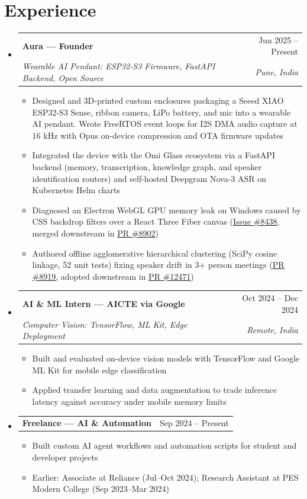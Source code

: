 \documentclass[a4paper,11pt]{article}
\makeatletter
\newcommand{\resumeItem}[1]{
  \item\small{#1}
}
\newcommand{\resumeItemListStart}{\begin{itemize}[rightmargin=0.11in]}
\newcommand{\resumeItemListEnd}{\end{itemize}}
\newcommand{\resumeQuadHeading}[4]{
  \item
  \begin{tabular*}{0.96\textwidth}[t]{l@{\extracolsep{\fill}}r}
    \textbf{#1} & #2 \\
    \textit{\small#3} & \textit{\small #4} \\
  \end{tabular*}
}
\newcommand{\resumeQuadHeadingChild}[2]{
  \item
  \begin{tabular*}{0.96\textwidth}[t]{l@{\extracolsep{\fill}}r}
    \textbf{\small#1} & {\small#2} \\
  \end{tabular*}
}
\newcommand{\resumeHeadingListStart}{
  \begin{itemize}[leftmargin=0.15in, label={}]
}
\newcommand{\resumeHeadingListEnd}{\end{itemize}}
\makeatother
\begin{document}
\section{Experience}
\resumeHeadingListStart{}
  \resumeQuadHeading{Aura --- Founder}{Jun 2025 -- Present}
  {Wearable AI Pendant: ESP32-S3 Firmware, FastAPI Backend, Open Source}{Pune, India}
    \resumeItemListStart{}
      \resumeItem{Designed and 3D-printed custom enclosures packaging a Seeed XIAO ESP32-S3 Sense, ribbon camera, LiPo battery, and mic into a wearable AI pendant. Wrote FreeRTOS event loops for I2S DMA audio capture at 16 kHz with Opus on-device compression and OTA firmware updates}
      \resumeItem{Integrated the device with the Omi Glass ecosystem via a FastAPI backend (memory, transcription, knowledge graph, and speaker identification routers) and self-hosted Deepgram Nova-3 ASR on Kubernetes Helm charts}
      \resumeItem{Diagnosed an Electron WebGL GPU memory leak on Windows caused by CSS backdrop filters over a React Three Fiber canvas (\href{https://github.com/BasedHardware/omi/issues/8438}{\uline{Issue \#8438}}, merged downstream in \href{https://github.com/BasedHardware/omi/pull/8902}{\uline{PR \#8902}})}
      \resumeItem{Authored offline agglomerative hierarchical clustering (SciPy cosine linkage, 52 unit tests) fixing speaker drift in 3+ person meetings (\href{https://github.com/BasedHardware/omi/pull/8919}{\uline{PR \#8919}}, adopted downstream in \href{https://github.com/BasedHardware/omi/pull/12471}{\uline{PR \#12471}})}
    \resumeItemListEnd{}

  \resumeQuadHeading{AI \& ML Intern --- AICTE via Google}{Oct 2024 -- Dec 2024}
  {Computer Vision: TensorFlow, ML Kit, Edge Deployment}{Remote, India}
    \resumeItemListStart{}
      \resumeItem{Built and evaluated on-device vision models with TensorFlow and Google ML Kit for mobile edge classification}
      \resumeItem{Applied transfer learning and data augmentation to trade inference latency against accuracy under mobile memory limits}
    \resumeItemListEnd{}

  \resumeQuadHeadingChild{Freelance --- AI \& Automation}{Sep 2024 -- Present}
    \resumeItemListStart{}
      \resumeItem{Built custom AI agent workflows and automation scripts for student and developer projects}
      \resumeItem{Earlier: Associate at Reliance (Jul--Oct 2024); Research Assistant at PES Modern College (Sep 2023--Mar 2024)}
    \resumeItemListEnd{}
\resumeHeadingListEnd{}


\end{document}
